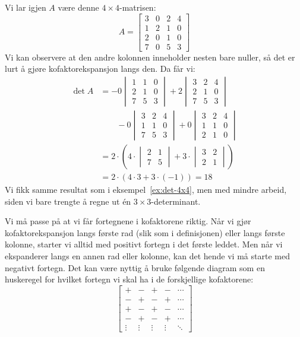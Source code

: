 \begin{ex}
Vi lar igjen $A$ være denne $4 \times 4$-matrisen:
\[
A =
\begin{bmatrix}
3 & 0 & 2 & 4 \\
1 & 2 & 1 & 0 \\
2 & 0 & 1 & 0 \\
7 & 0 & 5 & 3
\end{bmatrix}
\]
Vi kan observere at den andre kolonnen inneholder nesten bare nuller,
så det er lurt å gjøre kofaktor\-ekspansjon langs den.  Da får vi:
\begin{align*}
\det A &=
- 0 \begin{vmatrix}
1 & 1 & 0 \\
2 & 1 & 0 \\
7 & 5 & 3
\end{vmatrix}
+ 2 \begin{vmatrix}
3 & 2 & 4 \\
2 & 1 & 0 \\
7 & 5 & 3
\end{vmatrix}
\\
&\qquad
- 0 \begin{vmatrix}
3 & 2 & 4 \\
1 & 1 & 0 \\
7 & 5 & 3
\end{vmatrix}
+ 0 \begin{vmatrix}
3 & 2 & 4 \\
1 & 1 & 0 \\
2 & 1 & 0
\end{vmatrix}
\\
&= 2 \cdot \left( 4 \cdot \begin{vmatrix} 2 & 1 \\ 7 & 5 \end{vmatrix} +
                  3 \cdot \begin{vmatrix} 3 & 2 \\ 2 & 1 \end{vmatrix} \right)
\\
&= 2 \cdot (4 \cdot 3 + 3 \cdot (-1))
 = 18
\end{align*}
Vi fikk samme resultat som i eksempel~\ref{ex:det-4x4}, men med mindre
arbeid, siden vi bare trengte å regne ut én $3 \times 3$-determinant.
\end{ex}

Vi må passe på at vi får fortegnene i kofaktorene riktig.  Når vi gjør
kofaktorekspansjon langs første rad (slik som i definisjonen) eller
langs første kolonne, starter vi alltid med positivt fortegn i det
første leddet.  Men når vi ekspanderer langs en annen rad eller
kolonne, kan det hende vi må starte med negativt fortegn.  Det kan
være nyttig å bruke følgende diagram som en huskeregel for hvilket
fortegn vi skal ha i de forskjellige kofaktorene:
\[
\begin{bmatrix}
+ & - & + & - & \cdots \\
- & + & - & + & \cdots \\
+ & - & + & - & \cdots \\
- & + & - & + & \cdots \\
\vdots & \vdots & \vdots & \vdots & \ddots
\end{bmatrix}
\]


